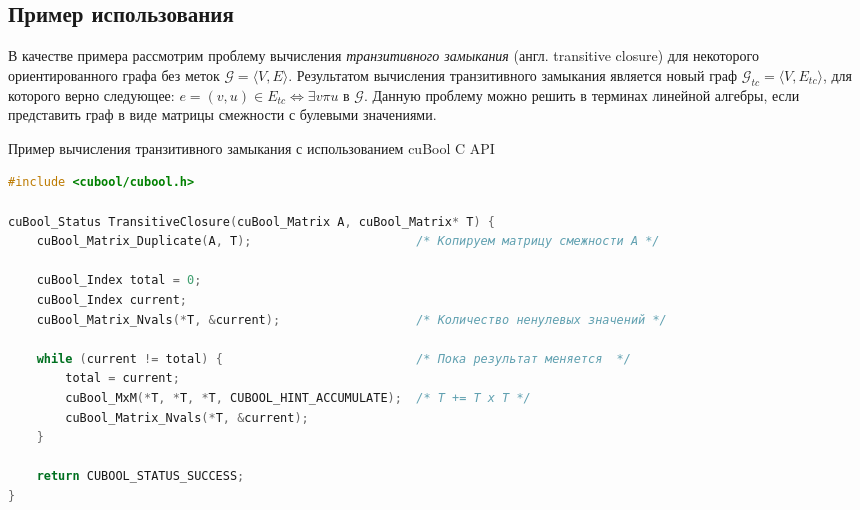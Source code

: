 \subsection{Пример использования}

В качестве примера рассмотрим проблему вычисления \textit{транзитивного замыкания} (англ. transitive closure) для некоторого ориентированного графа без меток $\mathcal{G} = \langle V, E \rangle$. Результатом вычисления транзитивного замыкания является новый граф $\mathcal{G}_{tc} = \langle V, E_{tc} \rangle$, для которого верно следующее: $e = (v,u) \in E_{tc} \iff \exists v \pi u $ в $\mathcal{G}$. Данную проблему можно решить в терминах линейной алгебры, если представить граф в виде матрицы смежности с булевыми значениями. 



\lstset{style=codelistingstyle}

\begin{algorithm}[t]
\caption{Пример вычисления транзитивного замыкания с использованием cuBool C API}
\label{alg:cubool_example}
\begin{lstlisting}[language=C++]
#include <cubool/cubool.h>

cuBool_Status TransitiveClosure(cuBool_Matrix A, cuBool_Matrix* T) {
    cuBool_Matrix_Duplicate(A, T);                       /* Копируем матрицу смежности А */

    cuBool_Index total = 0;
    cuBool_Index current;
    cuBool_Matrix_Nvals(*T, &current);                   /* Количество ненулевых значений */

    while (current != total) {                           /* Пока результат меняется  */
        total = current;
        cuBool_MxM(*T, *T, *T, CUBOOL_HINT_ACCUMULATE);  /* T += T x T */
        cuBool_Matrix_Nvals(*T, &current);
    }

    return CUBOOL_STATUS_SUCCESS;
}
\end{lstlisting}
\end{algorithm}

